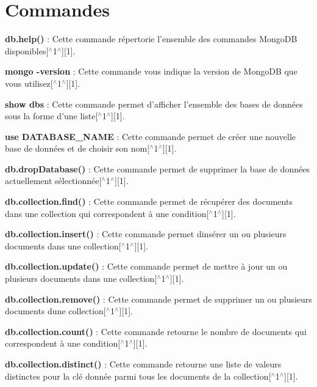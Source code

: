 \section*{Commandes}


\begin{DoxyItemize}
\item {\bfseries db.\+help()} \+: Cette commande répertorie l’ensemble des commandes Mongo\+DB disponibles\mbox{[}$^\wedge$1$^\wedge$\mbox{]}\mbox{[}1\mbox{]}.
\item {\bfseries mongo -\/version} \+: Cette commande vous indique la version de Mongo\+DB que vous utilisez\mbox{[}$^\wedge$1$^\wedge$\mbox{]}\mbox{[}1\mbox{]}.
\item {\bfseries show dbs} \+: Cette commande permet d’afficher l’ensemble des bases de données sous la forme d’une liste\mbox{[}$^\wedge$1$^\wedge$\mbox{]}\mbox{[}1\mbox{]}.
\item {\bfseries use D\+A\+T\+A\+B\+A\+S\+E\+\_\+\+N\+A\+ME} \+: Cette commande permet de créer une nouvelle base de données et de choisir son nom\mbox{[}$^\wedge$1$^\wedge$\mbox{]}\mbox{[}1\mbox{]}.
\item {\bfseries db.\+drop\+Database()} \+: Cette commande permet de supprimer la base de données actuellement sélectionnée\mbox{[}$^\wedge$1$^\wedge$\mbox{]}\mbox{[}1\mbox{]}.
\item {\bfseries db.\+collection.\+find()} \+: Cette commande permet de récupérer des documents dans une collection qui correspondent à une condition\mbox{[}$^\wedge$1$^\wedge$\mbox{]}\mbox{[}1\mbox{]}.
\item {\bfseries db.\+collection.\+insert()} \+: Cette commande permet d\textquotesingle{}insérer un ou plusieurs documents dans une collection\mbox{[}$^\wedge$1$^\wedge$\mbox{]}\mbox{[}1\mbox{]}.
\item {\bfseries db.\+collection.\+update()} \+: Cette commande permet de mettre à jour un ou plusieurs documents dans une collection\mbox{[}$^\wedge$1$^\wedge$\mbox{]}\mbox{[}1\mbox{]}.
\item {\bfseries db.\+collection.\+remove()} \+: Cette commande permet de supprimer un ou plusieurs documents d\textquotesingle{}une collection\mbox{[}$^\wedge$1$^\wedge$\mbox{]}\mbox{[}1\mbox{]}.
\item {\bfseries db.\+collection.\+count()} \+: Cette commande retourne le nombre de documents qui correspondent à une condition\mbox{[}$^\wedge$1$^\wedge$\mbox{]}\mbox{[}1\mbox{]}.
\item {\bfseries db.\+collection.\+distinct()} \+: Cette commande retourne une liste de valeurs distinctes pour la clé donnée parmi tous les documents de la collection\mbox{[}$^\wedge$1$^\wedge$\mbox{]}\mbox{[}1\mbox{]}.

\end{DoxyItemize}
